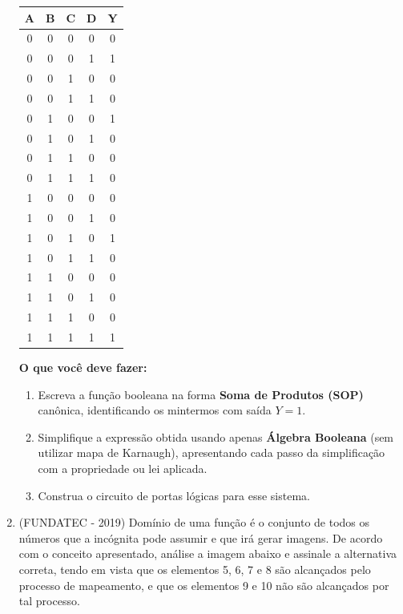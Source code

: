\documentclass[12pt,a4paper]{article}
\newcommand{\resposta}[1]{
\noindent
\framebox[\textwidth]{
\begin{minipage}{0.98\textwidth}
\vspace{#1}
\end{minipage}
}
}
\begin{document}
\begin{enumerate}
    \medskip
    \begin{minipage}[c]{0.35\textwidth}
        \centering
        \renewcommand{\arraystretch}{1.2}
        \begin{tabular}{|c|c|c|c||c|}
          \hline
          \textbf{A} & \textbf{B} & \textbf{C} & \textbf{D} & \textbf{Y} \\
          \hline
          0 & 0 & 0 & 0 & 0 \\
          0 & 0 & 0 & 1 & 1 \\
          0 & 0 & 1 & 0 & 0 \\
          0 & 0 & 1 & 1 & 0 \\
          0 & 1 & 0 & 0 & 1 \\
          0 & 1 & 0 & 1 & 0 \\
          0 & 1 & 1 & 0 & 0 \\
          0 & 1 & 1 & 1 & 0 \\
          1 & 0 & 0 & 0 & 0 \\
          1 & 0 & 0 & 1 & 0 \\
          1 & 0 & 1 & 0 & 1 \\
          1 & 0 & 1 & 1 & 0 \\
          1 & 1 & 0 & 0 & 0 \\
          1 & 1 & 0 & 1 & 0 \\
          1 & 1 & 1 & 0 & 0 \\
          1 & 1 & 1 & 1 & 1 \\
          \hline
        \end{tabular}
    \end{minipage}
    \hfill
    \begin{minipage}[c]{0.6\textwidth}
        \textbf{O que você deve fazer:}
        \begin{enumerate}[label=\textbf{\alph*)}, leftmargin=1cm]
          \item Escreva a função booleana na forma \textbf{Soma de Produtos (SOP)} canônica, identificando os mintermos com saída $Y = 1$.
          \item Simplifique a expressão obtida usando apenas \textbf{Álgebra Booleana} (sem utilizar mapa de Karnaugh), apresentando cada passo da simplificação com a propriedade ou lei aplicada.
          \item Construa o circuito de portas lógicas para esse sistema.
        \end{enumerate}
    \end{minipage}
    
    \resposta{15cm}
    \item (FUNDATEC - 2019) Domínio de uma função é o conjunto de todos os números que a incógnita pode assumir e que irá gerar imagens. De acordo com o conceito apresentado, análise a imagem abaixo e assinale a alternativa correta, tendo em vista que os elementos 5, 6, 7 e 8 são alcançados pelo processo de mapeamento, e que os elementos 9 e 10 não são alcançados por tal processo.  
    

\end{enumerate}
\end{document}
